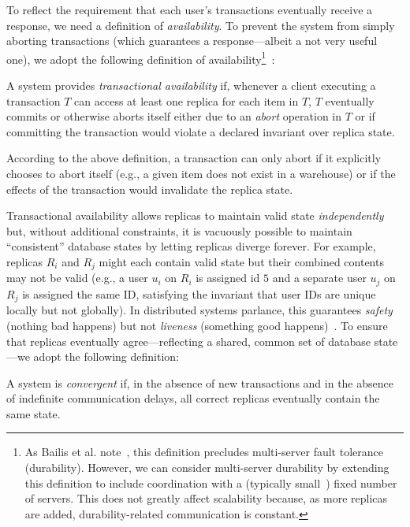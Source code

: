  To reflect the requirement that each user's
transactions eventually receive a response, we need a definition of
\textit{availability}. To prevent the system from simply aborting
transactions (which guarantees a response---albeit a not very useful
one), we adopt the following definition of
availability\footnote{As Bailis et
  al. note~\cite{hat-vldb}, this definition precludes multi-server
  fault tolerance (durability). However, we can consider multi-server
  durability by extending this definition to include coordination with
  a (typically small~\cite{bigtable,spanner,dynamo}) fixed number of
  servers. This does not greatly affect scalability because, as more
  replicas are added, durability-related communication is constant.}~\cite{hat-vldb}:

\begin{definition} 
A system provides \textit{transactional availability} if, whenever a
client executing a transaction $T$ can access at least one replica for
each item in $T$, $T$ eventually commits or otherwise aborts itself
either due to an \textit{abort} operation in $T$ or if committing the
transaction would violate a declared invariant over replica state.
\end{definition}

According to the above definition, a transaction can only abort if it
explicitly chooses to abort itself (e.g., a given item does not exist
in a warehouse) or if the effects of the transaction would invalidate
the replica state.

 Transactional availability allows replicas to
maintain valid state \textit{independently} but, without additional
constraints, it is vacuously possible to maintain ``consistent''
database states by letting replicas diverge forever. For example,
replicas $R_i$ and $R_j$ might each contain valid state but their
combined contents may not be valid (e.g., a user $u_i$ on $R_i$ is
assigned id $5$ and a separate user $u_j$ on $R_j$ is assigned the
same ID, satisfying the invariant that user IDs are unique locally but
not globally). In distributed systems parlance, this guarantees
\textit{safety} (nothing bad happens) but not \textit{liveness}
(something good happens)~\cite{lamport-safety}. To ensure that
replicas eventually agree---reflecting a shared, common set of
database state---we adopt the following definition:

\begin{definition}A system is \textit{convergent} if, in the
absence of new transactions and in the absence of indefinite
communication delays, all correct replicas eventually contain the same
state.
\end{definition}

